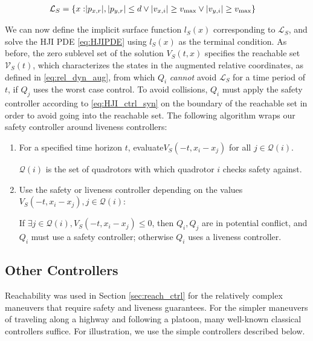 \begin{equation}
\begin{aligned}
\mathcal{L}_S = \{x: &|p_{x,r}|, |p_{y,r}|\le d \vee |v_{x,i}| \ge v_\text{max} \vee |v_{y,i}| \ge v_\text{max} \}
\end{aligned}
\end{equation}

We can now define the implicit surface function $l_S(x)$ corresponding to $\mathcal{L}_S$, and solve the HJI PDE \eqref{eq:HJIPDE} using $l_S(x)$ as the terminal condition. As before, the zero sublevel set of the solution $V_S(t,x)$ specifies the reachable set $\mathcal{V}_S(t)$, which characterizes the states in the augmented relative coordinates, as defined in \eqref{eq:rel_dyn_aug}, from which $Q_i$ \textit{cannot} avoid $\mathcal{L}_S$ for a time period of $t$, if $Q_j$ uses the worst case control. To avoid collisions, $Q_i$ must apply the safety controller according to \eqref{eq:HJI_ctrl_syn} on the boundary of the reachable set in order to avoid going into the reachable set. The following algorithm wraps our safety controller around liveness controllers:

\begin{enumerate}
\item For a specified time horizon $t$, evaluate$V_S(-t,x_i-x_j)$ for all $j\in \mathcal{Q}(i)$.

$\mathcal{Q}(i)$ is the set of quadrotors with which quadrotor $i$ checks safety against.
\item Use the safety or liveness controller depending on the values $V_S(-t,x_i-x_j),j\in \mathcal{Q}(i)$: 

If $\exists j\in \mathcal{Q}(i),V_S(-t,x_i-x_j)\le 0$, then $Q_i,Q_j$ are in potential conflict, and $Q_i$ must use a safety controller; otherwise $Q_i$ uses a liveness controller.
\end{enumerate}

\subsection{Other Controllers \label{sec:other_ctrl}}
Reachability was used in Section \ref{sec:reach_ctrl} for the relatively complex maneuvers that require safety and liveness guarantees. For the simpler maneuvers of traveling along a highway and following a platoon, many well-known classical controllers suffice. For illustration, we use the simple controllers described below.

